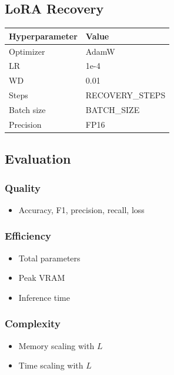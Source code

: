 \subsection{LoRA Recovery}

\begin{table}[H]
\centering
\small
\begin{tabular}{ll}
\toprule
\textbf{Hyperparameter} & \textbf{Value} \\
\midrule
Optimizer & AdamW \\
LR & 1e-4 \\
WD & 0.01 \\
Steps & {{RECOVERY\_STEPS}} \\
Batch size & {{BATCH\_SIZE}} \\
Precision & FP16 \\
\bottomrule
\end{tabular}
\end{table}

\subsection{Evaluation}

\subsubsection{Quality}
\begin{itemize}
\item Accuracy, F1, precision, recall, loss

\end{itemize}
\subsubsection{Efficiency}
\begin{itemize}
\item Total parameters
\item Peak VRAM
\item Inference time

\end{itemize}
\subsubsection{Complexity}
\begin{itemize}
\item Memory scaling with $L$
\item Time scaling with $L$

\end{itemize}
